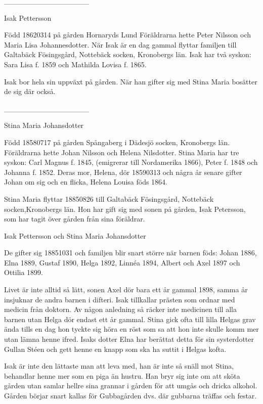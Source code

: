 


________________


Isak Pettersson


Född 18620314 på gården Hornaryds Lund
Föräldrarna hette Peter Nilsson och Maria Lisa Johannesdotter. När Isak är en dag gammal flyttar familjen till Galtabäck Fösingsgård, Nottebäck socken, Kronobergs län. Isak har två syskon: Sara Lisa f. 1859 och Mathilda Lovisa f. 1865.




Isak bor hela sin uppväxt på gården. När han gifter sig med Stina Maria bosätter de sig där också.


________________


Stina Maria Johansdotter


Född 18580717 på gården Spångaberg i Dädesjö socken, Kronobergs län. Föräldrarna hette Johan Nilsson och Helena Nilsdotter. Stina Maria har tre syskon: Carl Magnus f. 1845, (emigrerar till Nordamerika 1866), Peter f. 1848 och Johanna f. 1852. Deras mor, Helena, dör 18590313 och några år senare gifter Johan om sig och en flicka, Helena Louisa föds 1864.


Stina Maria flyttar 18850826 till Galtabäck Fösingsgård, Nottebäck socken,Kronobergs län. 
Hon har gift sig med sonen på gården, Isak Petersson, som har tagit över gården från sina föräldrar. 










Isak Pettersson och Stina Maria Johansdotter


De gifter sig 18851031 och familjen blir snart större när barnen föds: Johan 1886, Elna 1889, Gustaf 1890, Helga 1892, Linnéa 1894, Albert och Axel 1897 och Ottilia 1899.


Livet är inte alltid så lätt, sonen Axel dör bara ett år gammal 1898, samma år insjuknar de andra barnen i difteri. Isak tillkallar prästen som ordnar med medicin från doktorn. Av någon anledning så räcker inte medicinen till alla barnen utan Helga dör endast ett år gammal. Stina gick ofta till lilla Helgas grav ända tills en dag hon tyckte sig höra en röst som sa att hon inte skulle komm mer utan lämna henne ifred. Isaks dotter Elna har berättat detta för sin systerdotter Gullan Stéen och gett henne en knapp som ska ha suttit i Helgas kofta.


Isak är inte den lättaste man att leva med, han är inte så snäll mot Stina, behandlar henne mer som en piga än hustru. Han bryr sig inte om att sköta gården utan samlar hellre sina grannar i gården för att umgås och dricka alkohol. Gården börjar snart kallas för Gubbagården dvs. där gubbarna träffas och festar. 


